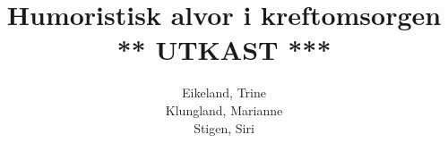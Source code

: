 \documentclass[a4paper,norsk,12pt,twoside]{report}
\begin{document}
  \author{Eikeland, Trine\\Klungland, Marianne\\Stigen, Siri}
  \title{Humoristisk alvor i kreftomsorgen \\
    {\Huge{\sffamily *** UTKAST ***}}}

  \maketitle
  \begin{abstract}
  
  \end{abstract}

  \tableofcontents

  \clearpage

  
  
  
  
  
  
  
  \clearpage

  \begingroup %
  \raggedright %
  \nocite{*} %
  
  \endgroup %

  \appendix
  
  \clearpage %
  \printindex
\end{document}

